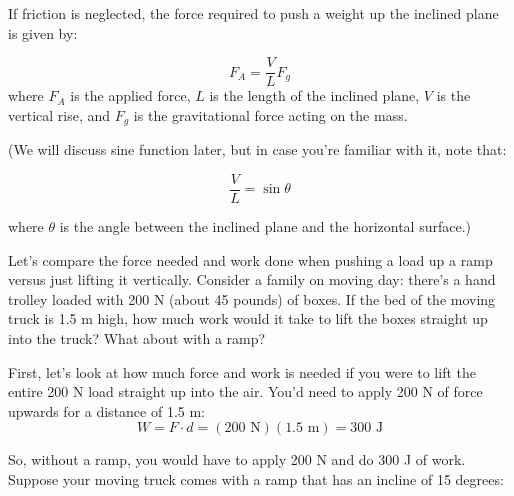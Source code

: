 If friction is neglected, the force required to push a weight up the inclined 
plane is given by:

\[
F_A = \frac{V}{L} F_g
\]
where \( F_A \) is the applied force, \( L \) is the length of the inclined plane, \( V \) is the vertical rise, and \( F_g \) is the gravitational force acting on the mass.

\begin{center}
\end{center}

(We will discuss sine function later, but in case you're familiar with it, note that:

\[
\frac{V}{L} = \sin{\theta}
\]

where \( \theta \) is the angle between the inclined plane and the horizontal surface.)

Let's compare the force needed and work done when pushing a load up a ramp 
versus just lifting it vertically. Consider a family on moving day: there's a 
hand trolley loaded with 200 N (about 45 pounds) of boxes. If the bed of the 
moving truck is 1.5 m high, how much work would it take to lift the boxes 
straight up into the truck? What about with a ramp? 

First, let's look at how much force and work is needed if you were to lift the 
entire 200 N load straight up into the air. You'd need to apply 200 N of force 
upwards for a distance of 1.5 m:
$$W = F \cdot d = \left( 200 \text{ N} \right) \left( 1.5 \text{ m} \right) = 300 \text{ J}$$

So, without a ramp, you would have to apply 200 N and do 300 J of work. Suppose 
your moving truck comes with a ramp that has an incline of 15 degrees:

